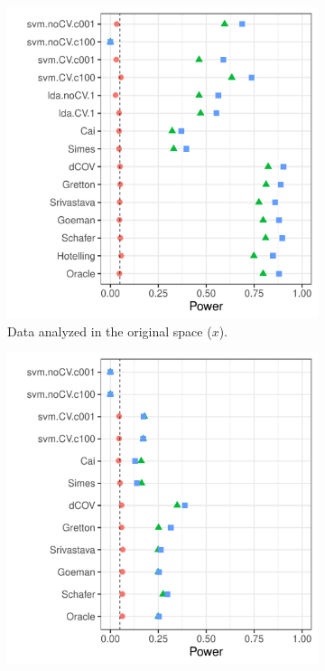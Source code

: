 \documentclass[oupdraft]{bio}
\begin{document}
\begin{figure}[th]
	\centering
	\begin{subfigure}[t]{.45\columnwidth}
		\centering
		\includegraphics[width=1\columnwidth]{"file41"}
		\caption{Data analyzed in the original space ($x$).}
		\label{fig:interactions-in-original-space}
	\end{subfigure}
	\begin{subfigure}[t]{.45\columnwidth}
		\centering
		\includegraphics[width=1\columnwidth]{"file45"}

\end{subfigure}
\end{figure}
\end{document}
